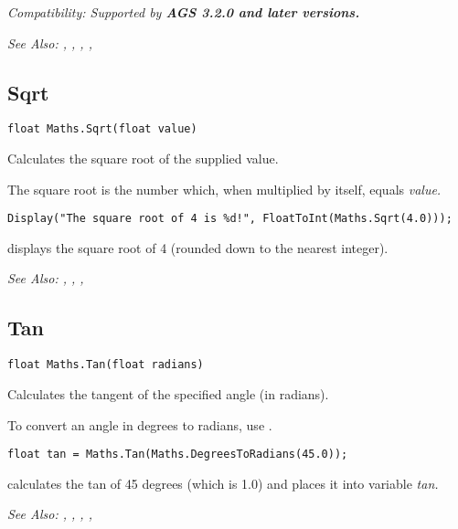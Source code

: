 \it{Compatibility:} Supported by \bf{AGS 3.2.0} and later versions.

\it{See Also:} ,
,
,
, 


\subsection{Sqrt}\label{Maths.Sqrt}%

\begin{verbatim}
float Maths.Sqrt(float value)
\end{verbatim}
Calculates the square root of the supplied value.

The square root is the number which, when multiplied by itself, equals \it{value}.

\begin{verbatim}
Display("The square root of 4 is %d!", FloatToInt(Maths.Sqrt(4.0)));
\end{verbatim}
displays the square root of 4 (rounded down to the nearest integer).

\it{See Also:} ,
,
, 


\subsection{Tan}\label{Maths.Tan}%

\begin{verbatim}
float Maths.Tan(float radians)
\end{verbatim}
Calculates the tangent of the specified angle (in radians).

To convert an angle in degrees to radians, use .

\begin{verbatim}
float tan = Maths.Tan(Maths.DegreesToRadians(45.0));
\end{verbatim}
calculates the tan of 45 degrees (which is 1.0) and places it into variable \it{tan}.

\it{See Also:} ,
,
,
, 


